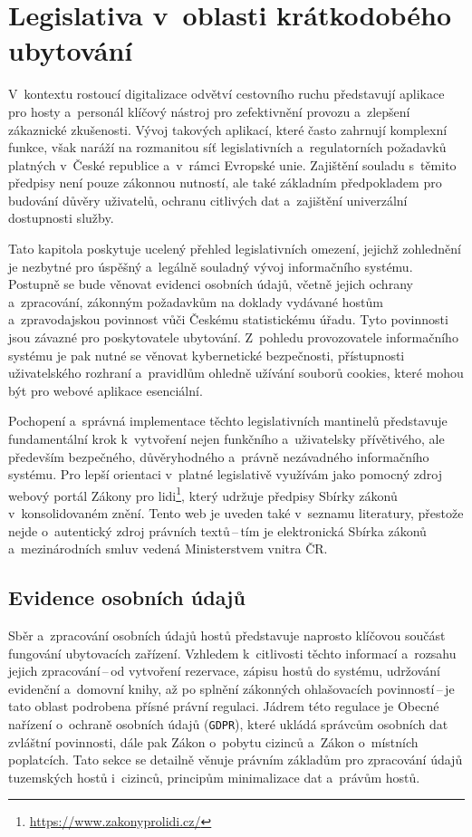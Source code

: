 \chapter{Legislativa v~oblasti krátkodobého ubytování}
\label{ch:legislativa}

V~kontextu rostoucí digitalizace odvětví cestovního ruchu představují aplikace pro hosty a~personál klíčový nástroj pro zefektivnění provozu a~zlepšení zákaznické zkušenosti.
Vývoj takových aplikací, které často zahrnují komplexní funkce, však naráží na rozmanitou síť legislativních a~regulatorních požadavků platných v~České republice a~v~rámci Evropské unie.
Zajištění souladu s~těmito předpisy není pouze zákonnou nutností, ale také základním předpokladem pro budování důvěry uživatelů, ochranu citlivých dat a~zajištění univerzální dostupnosti služby.

Tato kapitola poskytuje ucelený přehled legislativních omezení, jejichž zohlednění je nezbytné pro úspěšný a~legálně souladný vývoj informačního systému.
Postupně se bude věnovat evidenci osobních údajů, včetně jejich ochrany a~zpracování, zákonným požadavkům na doklady vydávané hostům a~zpravodajskou povinnost vůči Českému statistickému úřadu.
Tyto povinnosti jsou závazné pro poskytovatele ubytování.
Z~pohledu provozovatele informačního systému je pak nutné se věnovat kybernetické bezpečnosti, přístupnosti uživatelského rozhraní a~pravidlům ohledně užívání souborů cookies, které mohou být pro webové aplikace esenciální.

Pochopení a~správná implementace těchto legislativních mantinelů představuje fundamentální krok k~vytvoření nejen funkčního a~uživatelsky přívětivého, ale především bezpečného, důvěryhodného a~právně nezávadného informačního systému.
Pro lepší orientaci v~platné legislativě využívám jako pomocný zdroj webový portál Zákony pro lidi\footnote{\url{https://www.zakonyprolidi.cz/}}, který udržuje předpisy Sbírky zákonů v~konsolidovaném znění.
Tento web je uveden také v~seznamu literatury, přestože nejde o~autentický zdroj právních textů\,--\,tím je elektronická Sbírka zákonů a~mezinárodních smluv vedená Ministerstvem vnitra ČR.

\section{Evidence osobních údajů}
\label{sec:01-evidention}
Sběr a~zpracování osobních údajů hostů představuje naprosto klíčovou součást fungování ubytovacích zařízení.
Vzhledem k~citlivosti těchto informací a~rozsahu jejich zpracování\,--\,od vytvoření rezervace, zápisu hostů do systému, udržování evidenční a~domovní knihy, až po splnění zákonných ohlašovacích povinností\,--\,je tato oblast podrobena přísné právní regulaci.
Jádrem této regulace je Obecné nařízení o~ochraně osobních údajů (\texttt{GDPR}), které ukládá správcům osobních dat zvláštní povinnosti, dále pak Zákon o~pobytu cizinců a~Zákon o~místních poplatcích.
Tato sekce se detailně věnuje právním základům pro zpracování údajů tuzemských hostů i~cizinců, principům minimalizace dat a~právům hostů.

